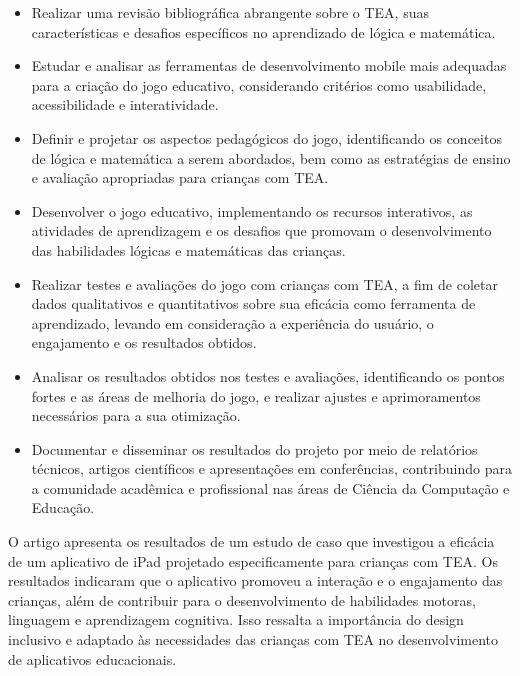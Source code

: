 \documentclass[tcc1,project]{classe_uftex/uftex}
\begin{document}
\begin{itemize}
    \item Realizar uma revisão bibliográfica abrangente sobre o TEA, suas características e desafios específicos no aprendizado de lógica e matemática.
    
    \item Estudar e analisar as ferramentas de desenvolvimento mobile mais adequadas para a criação do jogo educativo, considerando critérios como usabilidade, acessibilidade e interatividade.

      \item Definir e projetar os aspectos pedagógicos do jogo, identificando os conceitos de lógica e matemática a serem abordados, bem como as estratégias de ensino e avaliação apropriadas para crianças com TEA.


        \item Desenvolver o jogo educativo, implementando os recursos interativos, as atividades de aprendizagem e os desafios que promovam o desenvolvimento das habilidades lógicas e matemáticas das crianças.

        \item Realizar testes e avaliações do jogo com crianças com TEA, a fim de coletar dados qualitativos e quantitativos sobre sua eficácia como ferramenta de aprendizado, levando em consideração a experiência do usuário, o engajamento e os resultados obtidos.

        \item Analisar os resultados obtidos nos testes e avaliações, identificando os pontos fortes e as áreas de melhoria do jogo, e realizar ajustes e aprimoramentos necessários para a sua otimização.

        \item Documentar e disseminar os resultados do projeto por meio de relatórios técnicos, artigos científicos e apresentações em conferências, contribuindo para a comunidade acadêmica e profissional nas áreas de Ciência da Computação e Educação.

\end{itemize}

O artigo \cite{Fletcher} apresenta os resultados de um estudo de caso que investigou a eficácia de um aplicativo de iPad projetado especificamente para crianças com TEA. Os resultados indicaram que o aplicativo promoveu a interação e o engajamento das crianças, além de contribuir para o desenvolvimento de habilidades motoras, linguagem e aprendizagem cognitiva. Isso ressalta a importância do design inclusivo e adaptado às necessidades das crianças com TEA no desenvolvimento de aplicativos educacionais.\\
\end{document}
